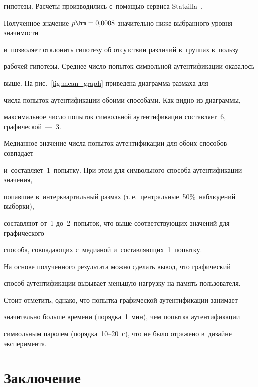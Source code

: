 гипотезы. Расчеты производились с~помощью сервиса Statzilla~\cite{statzilla}. 


Полученное значение $p \hm= 0{,}0008$ значительно ниже выбранного уровня значимости 


и~позволяет отклонить гипотезу об отсутствии различий в~группах в~пользу 


рабочей гипотезы. Среднее число попыток символьной аутентификации оказалось 


выше. На рис.~\ref{fig:mean_graph} приведена диаграмма размаха для 


числа попыток аутентификации обоими способами. Как видно из диаграммы, 


максимальное число попыток символьной аутентификации составляет~6, графической~---~3. 


Медианное значение числа попыток аутентификации для обоих способов совпадает 


и~составляет~1~попытку. При этом для символьного способа аутентификации значения, 


попавшие в~интерквартильный размах (т.\,е.\ центральные~50\%~наблюдений выборки), 


составляют от~1 до~2~попыток, что выше соответствующих значений для графического 


способа, сов\-па\-да\-ющих с~медианой и~со\-став\-ля\-ющих~1~попытку.

















На основе полученного результата можно сделать вывод, что графический 


способ аутентификации вызывает меньшую нагрузку на память пользователя. 


Стоит отметить, однако, что попытка графической аутентификации занимает 


значительно больше времени (порядка~1~мин), чем попытка аутентификации 


символьным паролем (порядка~10--20~с), что не было отражено в~дизайне эксперимента.





\section{Заключение}





